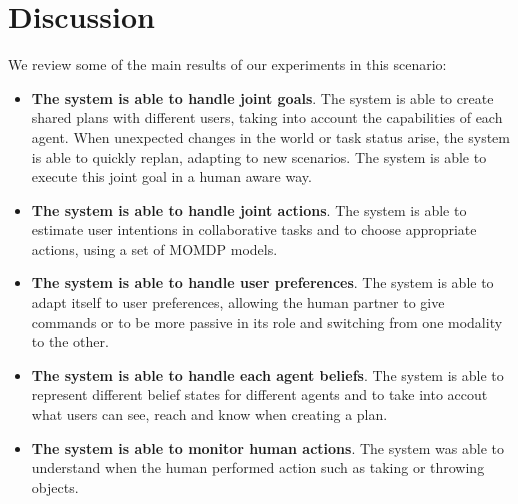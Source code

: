 \section{Discussion}
\label{sec:coworker_experiments-discussion}
We review some of the main results of our experiments in this scenario:
\begin{itemize}

\item
\textbf{The system is able to handle joint goals}.
The system is able to create shared plans with different users, taking
into account the capabilities of each agent. When unexpected changes
in the world or task status arise, the system is able to quickly
replan, adapting to new scenarios. The system is able to execute this
joint goal in a human aware way. 
                                
\item
\textbf{The system is able to handle joint actions}.
The system is able to estimate user intentions in collaborative tasks and to choose appropriate actions, using a set of MOMDP models.

\item
\textbf{The system is able to handle user preferences}.
The system is able to adapt itself to user preferences, allowing the
human partner to give commands or to be more passive in its role and
switching from one modality to the other. 
\item
\textbf{The system is able to handle each agent beliefs}.
The system is able to represent different belief states for different agents and to take into accout what users can see, reach and know when creating a plan.

\item
\textbf{The system is able to monitor human actions}.
The system was able to understand when the human performed action such as taking or throwing objects.
\end{itemize}

